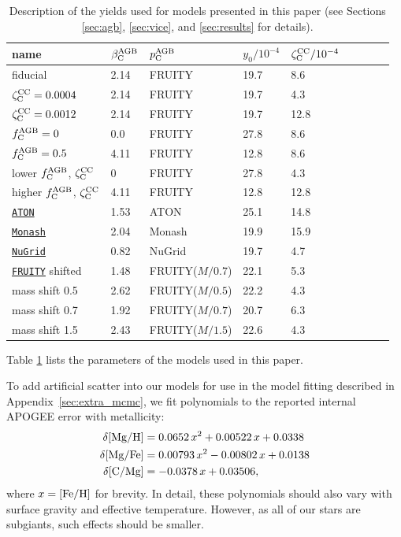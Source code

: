 \documentclass[fleqn,
usenatbib]{mnras}
\newcommand{\fruity}{\texttt{\hyperlink{fruity}{FRUITY}}}
\newcommand{\nugrid}{\texttt{\hyperlink{nugrid}{NuGrid}}}
\newcommand{\monash}{\texttt{\hyperlink{monash}{Monash}}}
\newcommand{\aton}{\texttt{\hyperlink{aton}{ATON}}}
\newcommand{\ycagb}{\y_{\rm C}^{\rm AGB}}
\newcommand{\y}{p}
\newcommand{\aagb}{\beta_{\rm C}^{\rm AGB}}
\newcommand{\fagb}{f_{\rm C}^{\rm AGB}}
\newcommand{\yo}{y_0}
\newcommand{\zcc}{\zeta_{\rm C}^{\rm CC}}
\begin{document}
\begin{table}
	\centering
        \caption[]{Description of the yields used for models presented in this
        paper (see Sections \ref{sec:agb}, \ref{sec:vice}, and \ref{sec:results}
        for details).
        }
	\label{tab:model_parameters}

	\begin{tabular}{l l l l l l l l l}
		\hline
            name & $\aagb$ & $\ycagb$ & $\yo/10^{-4}$ & $\zcc/10^{-4}$ \\ 
            \hline
            fiducial & 2.14 & FRUITY & 19.7 & 8.6 \\
            $\zcc=0.0004$ & 2.14 & FRUITY & 19.7 & 4.3 \\
            $\zcc=0.0012$ & 2.14 & FRUITY & 19.7 & 12.8 \\
            $\fagb = 0$ & 0.0 & FRUITY & 27.8 & 8.6 \\
            $\fagb = 0.5$ & 4.11 & FRUITY & 12.8 & 8.6 \\
            lower $\fagb$, $\zcc$ & 0 & FRUITY & 27.8 & 4.3 \\
            higher $\fagb$, $\zcc$ & 4.11 & FRUITY & 12.8 & 12.8 \\
            \aton{} & 1.53 & ATON & 25.1 &  14.8 \\
            \monash{} & 2.04 & Monash & 19.9 & 15.9 \\
            \nugrid{} & 0.82 & NuGrid & 19.7 & 4.7 \\
            \fruity{} shifted & 1.48 & FRUITY($M/0.7$) & 22.1 & 5.3 \\
            mass shift 0.5 & 2.62 & FRUITY($M/0.5$)  & 22.2 & 4.3 \\
            mass shift 0.7 & 1.92 & FRUITY($M/0.7$) & 20.7 & 6.3 \\
            mass shift 1.5 & 2.43 & FRUITY($M/1.5$) & 22.6 & 4.3 \\
		\hline
	\end{tabular}
\end{table}


Table \ref{tab:model_parameters} lists the parameters of the models used in this paper.

To add artificial scatter into our models for use in the model fitting described in Appendix~\ref{sec:extra_mcmc}, we fit polynomials to the reported internal APOGEE error with metallicity: 
\begin{subequations}
\label{eq:uncertainties}
\begin{align}
    \delta {\rm [Mg/H]} &= 0.0652\,x^2 + 0.00522\,x + 0.0338 \\
    \delta {\rm [Mg/Fe]} &= 0.00793\,x^2 - 0.00802\,x + 0.0138 \\
    \delta {\rm [C/Mg]} &= -0.0378\,x + 0.03506,
\end{align}
\end{subequations} 
where $x = {\rm [Fe/H]}$ for brevity. In detail, these polynomials should also vary with surface gravity and effective temperature. However, as all of our stars are subgiants, such effects should be smaller.
\end{document}
